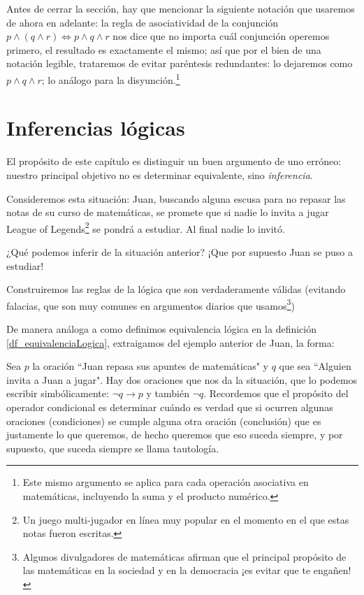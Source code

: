 \documentclass{book}
\theoremstyle{definition}
\begin{document}
Antes de cerrar la sección, hay que mencionar la siguiente notación que usaremos de ahora en adelante:
la regla de asociatividad de la conjunción $p \wedge (q \wedge r) \iff p \wedge q \wedge r$ nos dice que no importa cuál conjunción operemos primero, el resultado es exactamente el mismo; así que por el bien de una notación legible, trataremos de evitar paréntesis redundantes: lo dejaremos como $p \wedge q \wedge r$; lo análogo para la disyunción.\footnote{Este mismo argumento se aplica para cada operación asociativa en matemáticas, incluyendo la suma y el producto numérico.}

\section{Inferencias lógicas}
\label{sc_inferenciasLogicas}
El propósito de este capítulo es distinguir un buen argumento de uno erróneo: nuestro principal objetivo no es determinar equivalente, sino \emph{inferencia}.

Consideremos esta situación: Juan, buscando alguna escusa para no repasar las notas de su curso de matemáticas, se promete que si nadie lo invita a jugar League of Legends\footnote{Un juego multi-jugador en línea muy popular en el momento en el que estas notas fueron escritas.} se pondrá a estudiar. Al final nadie lo invitó.

¿Qué podemos inferir de la situación anterior? ¡Que por supuesto Juan se puso a estudiar!

Construiremos las reglas de la lógica que son verdaderamente válidas (evitando falacias, que son muy comunes en argumentos diarios que usamos\footnote{Algunos divulgadores de matemáticas afirman que el principal propósito de las matemáticas en la sociedad y en la democracia ¡es evitar que te engañen!})

De manera análoga a como definimos equivalencia lógica en la definición \ref{df_equivalenciaLogica}, extraigamos del ejemplo anterior de Juan, la forma:

Sea $p$ la oración ``Juan repasa sus apuntes de matemáticas" y $q$ que sea ``Alguien invita a Juan a jugar".
Hay dos oraciones que nos da la situación, que lo podemos escribir simbólicamente: $\neg q\rightarrow p$ y también $\neg q$.
Recordemos que el propósito del operador condicional es determinar cuándo es verdad que si ocurren algunas oraciones (condiciones) se cumple alguna otra oración (conclusión) que es justamente lo que queremos, de hecho queremos que eso suceda siempre, y por supuesto, que suceda siempre se llama tautología.
\end{document}
